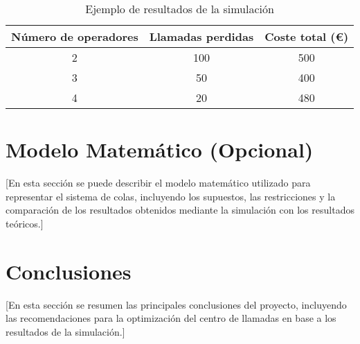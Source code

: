 \documentclass{article}
\begin{document}
\begin{table}
    \centering
    \caption{Ejemplo de resultados de la simulación}
    \begin{tabular}{ccc}
        \toprule
        Número de operadores & Llamadas perdidas & Coste total (€) \\
        \midrule
        2 & 100 & 500 \\
        3 & 50 & 400 \\
        4 & 20 & 480 \\
        \bottomrule
    \end{tabular}
\end{table}

\section{Modelo Matemático (Opcional)}

[En esta sección se puede describir el modelo matemático utilizado para representar el sistema de colas, incluyendo los supuestos, las restricciones y la comparación de los resultados obtenidos mediante la simulación con los resultados teóricos.]

\section{Conclusiones}

[En esta sección se resumen las principales conclusiones del proyecto, incluyendo las recomendaciones para la optimización del centro de llamadas en base a los resultados de la simulación.] 
\end{document}
